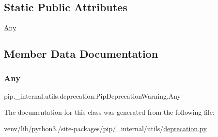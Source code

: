 \subsection*{Static Public Attributes}
\begin{DoxyCompactItemize}
\item 
\hyperlink{classpip_1_1__internal_1_1utils_1_1deprecation_1_1PipDeprecationWarning_a254ec265faf34c9e7553bd49596d0709}{Any}
\end{DoxyCompactItemize}


\subsection{Member Data Documentation}
\mbox{\label{classpip_1_1__internal_1_1utils_1_1deprecation_1_1PipDeprecationWarning_a254ec265faf34c9e7553bd49596d0709}} 
\subsubsection{\texorpdfstring{Any}{Any}}
{\footnotesize\ttfamily pip.\+\_\+internal.\+utils.\+deprecation.\+Pip\+Deprecation\+Warning.\+Any\hspace{0.3cm}{\ttfamily [static]}}



The documentation for this class was generated from the following file\+:\begin{DoxyCompactItemize}
\item 
venv/lib/python3./site-\/packages/pip/\+\_\+internal/utils/\hyperlink{pip_2__internal_2utils_2deprecation_8py}{deprecation.\+py}\end{DoxyCompactItemize}
